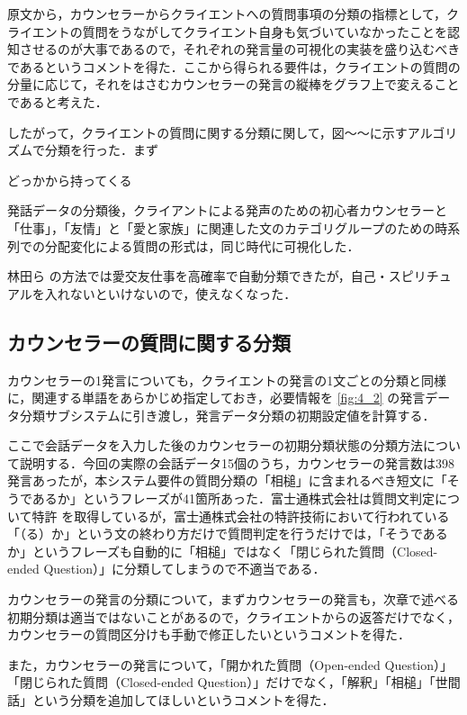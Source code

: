 \documentclass[shuuron]{kuee}
\begin{document}
原文から，カウンセラーからクライエントへの質問事項の分類の指標として，クライエントの質問をうながしてクライエント自身も気づいていなかったことを認知させるのが大事であるので，それぞれの発言量の可視化の実装を盛り込むべきであるというコメントを得た．ここから得られる要件は，クライエントの質問の分量に応じて，それをはさむカウンセラーの発言の縦棒をグラフ上で変えることであると考えた．

したがって，クライエントの質問に関する分類に関して，図〜〜に示すアルゴリズムで分類を行った．まず

どっかから持ってくる

発話データの分類後，クライアントによる発声のための初心者カウンセラーと「仕事」，「友情」と「愛と家族」に関連した文のカテゴリグループのための時系列での分配変化による質問の形式は，同じ時代に可視化した．

  林田ら\cite{hayashidaJp} \cite{hayashidaEn}の方法では愛交友仕事を高確率で自動分類できたが，自己・スピリチュアルを入れないといけないので，使えなくなった．

\subsection{カウンセラーの質問に関する分類} %

カウンセラーの1発言についても，クライエントの発言の1文ごとの分類と同様に，関連する単語をあらかじめ指定しておき，必要情報を
\ref{fig:4_2}
の発言データ分類サブシステムに引き渡し，発言データ分類の初期設定値を計算する．

ここで会話データを入力した後のカウンセラーの初期分類状態の分類方法について説明する．今回の実際の会話データ15個のうち，カウンセラーの発言数は398発言あったが，本システム要件の質問分類の「相槌」に含まれるべき短文に「そうであるか」というフレーズが41箇所あった．富士通株式会社は質問文判定について特許
\cite{tokkyo}
を取得しているが，富士通株式会社の特許技術において行われている「（る）か」という文の終わり方だけで質問判定を行うだけでは，「そうであるか」というフレーズも自動的に「相槌」ではなく「閉じられた質問（Closed-ended Question）」に分類してしまうので不適当である．

カウンセラーの発言の分類について，まずカウンセラーの発言も，次章で述べる初期分類は適当ではないことがあるので，クライエントからの返答だけでなく，カウンセラーの質問区分けも手動で修正したいというコメントを得た．

また，カウンセラーの発言について，「開かれた質問（Open-ended Question）」「閉じられた質問（Closed-ended Question）」だけでなく，「解釈」「相槌」「世間話」という分類を追加してほしいというコメントを得た．
\end{document}
